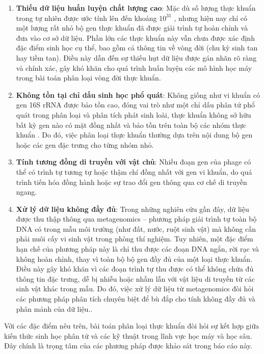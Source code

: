 \begin{enumerate}
    \item \textbf{Thiếu dữ liệu huấn luyện chất lượng cao}: Mặc dù số lượng thực khuẩn trong tự nhiên được ước tính lên đến khoảng $10^{31}$ \cite{doi:10.1128/jb.00052-20}, nhưng hiện nay chỉ có một lượng rất nhỏ bộ gen thực khuẩn đã được giải trình tự hoàn chỉnh và đưa vào cơ sở dữ liệu. Phần lớn các thực khuẩn này vẫn chưa được xác định đặc điểm sinh học cụ thể, bao gồm cả thông tin về vòng đời (chu kỳ sinh tan hay tiềm tan). Điều này dẫn đến sự thiếu hụt dữ liệu được gán nhãn rõ ràng và chính xác, gây khó khăn cho quá trình huấn luyện các mô hình học máy trong bài toán phân loại vòng đời thực khuẩn.
    \item \textbf{Không tồn tại chỉ dấu sinh học phổ quát}: Không giống như vi khuẩn có gen 16S rRNA được bảo tồn cao, đóng vai trò như một chỉ dấu phân tử phổ quát trong phân loại và phân tích phát sinh loài, thực khuẩn không sở hữu bất kỳ gen nào có mặt đồng nhất và bảo tồn trên toàn bộ các nhóm thực khuẩn \cite{PMID:31061483}. Do đó, việc phân loại thực khuẩn thường dựa trên nội dung bộ gen hoặc các gen đặc trưng cho từng nhóm nhỏ.
    \item \textbf{Tính tương đồng di truyền với vật chủ}: Nhiều đoạn gen của phage có thể có trình tự tương tự hoặc thậm chí đồng nhất với gen vi khuẩn, do quá trình tiến hóa đồng hành hoặc sự trao đổi gen thông qua cơ chế di truyền ngang.
    \item \textbf{Xử lý dữ liệu không đầy đủ}: Trong những nghiên cứu gần đây, dữ liệu được thu thập thông qua metagenomics – phương pháp giải trình tự toàn bộ DNA có trong mẫu môi trường (như đất, nước, ruột sinh vật) mà không cần phải nuôi cấy vi sinh vật trong phòng thí nghiệm. Tuy nhiên, một đặc điểm hạn chế của phương pháp này là chỉ thu được các đoạn DNA ngắn, rời rạc và không hoàn chỉnh, thay vì toàn bộ bộ gen đầy đủ của một loại thực khuẩn. Điều này gây khó khăn vì các đoạn trình tự thu được có thể không chứa đủ thông tin đặc trưng, dễ bị nhiễu hoặc nhầm lẫn với vật liệu di truyền từ các sinh vật khác trong mẫu. Do đó, việc xử lý dữ liệu từ metagenomics đòi hỏi các phương pháp phân tích chuyên biệt để bù đắp cho tính không đầy đủ và phân mảnh của dữ liệu..
\end{enumerate}

Với các đặc điểm nêu trên, bài toán phân loại thực khuẩn đòi hỏi sự kết hợp giữa kiến thức sinh học phân tử và các kỹ thuật trong lĩnh vực học máy và học sâu. Đây chính là trọng tâm của các phương pháp được khảo sát trong báo cáo này.

